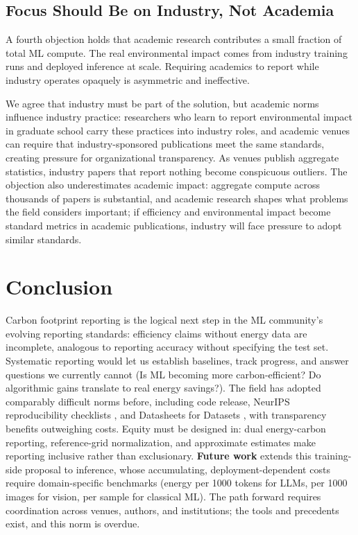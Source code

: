 \documentclass{article}
\theoremstyle{plain}
\theoremstyle{definition}
\theoremstyle{remark}
\begin{document}
\subsection{Focus Should Be on Industry, Not Academia}

A fourth objection holds that academic research contributes a small fraction of total ML compute. The real environmental impact comes from industry training runs and deployed inference at scale. Requiring academics to report while industry operates opaquely is asymmetric and ineffective.

We agree that industry must be part of the solution, but academic norms influence industry practice: researchers who learn to report environmental impact in graduate school carry these practices into industry roles, and academic venues can require that industry-sponsored publications meet the same standards, creating pressure for organizational transparency. As venues publish aggregate statistics, industry papers that report nothing become conspicuous outliers. The objection also underestimates academic impact: aggregate compute across thousands of papers is substantial, and academic research shapes what problems the field considers important; if efficiency and environmental impact become standard metrics in academic publications, industry will face pressure to adopt similar standards.

\section{Conclusion}

Carbon footprint reporting is the logical next step in the ML community's evolving reporting standards: efficiency claims without energy data are incomplete, analogous to reporting accuracy without specifying the test set. Systematic reporting would let us establish baselines, track progress, and answer questions we currently cannot (Is ML becoming more carbon-efficient? Do algorithmic gains translate to real energy savings?). The field has adopted comparably difficult norms before, including code release, NeurIPS reproducibility checklists \cite{pineau2021improving}, and Datasheets for Datasets \cite{gebru2021datasheets}, with transparency benefits outweighing costs. Equity must be designed in: dual energy-carbon reporting, reference-grid normalization, and approximate estimates make reporting inclusive rather than exclusionary. \textbf{Future work} extends this training-side proposal to inference, whose accumulating, deployment-dependent costs require domain-specific benchmarks (energy per 1000 tokens for LLMs, per 1000 images for vision, per sample for classical ML). The path forward requires coordination across venues, authors, and institutions; the tools and precedents exist, and this norm is overdue.
\end{document}
